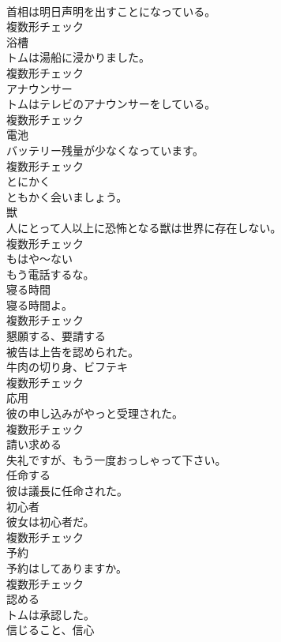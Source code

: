 \documentclass[8pt]{extreport}
\begin{document}
\begin{CJK}{UTF8}{min}
\\	首相は明日声明を出すことになっている。	
\\	複数形チェック
\\	[名詞]	浴槽	
\\	トムは湯船に浸かりました。	
\\	複数形チェック
\\	[名詞]	アナウンサー	
\\	トムはテレビのアナウンサーをしている。	
\\	複数形チェック
\\	[名詞]	電池	
\\	バッテリー残量が少なくなっています。	
\\	複数形チェック
\\	[副詞]	とにかく	
\\	ともかく会いましょう。	
\\	[名詞]	獣	
\\	人にとって人以上に恐怖となる獣は世界に存在しない。	
\\	複数形チェック
\\	[副詞]	もはや〜ない	
\\	もう電話するな。	
\\	[名詞]	寝る時間	
\\	寝る時間よ。	
\\	複数形チェック
\\	[動詞]	懇願する、要請する	
\\	被告は上告を認められた。	
\\	[名詞]	牛肉の切り身、ビフテキ	
\\	複数形チェック
\\	[名詞]	応用	
\\	彼の申し込みがやっと受理された。	
\\	複数形チェック
\\	[動詞]	請い求める	
\\	失礼ですが、もう一度おっしゃって下さい。	
\\	[動詞]	任命する	
\\	彼は議長に任命された。	
\\	[名詞]	初心者	
\\	彼女は初心者だ。	
\\	複数形チェック
\\	[名詞]	予約	
\\	予約はしてありますか。	
\\	複数形チェック
\\	[動詞]	認める	
\\	トムは承認した。	
\\	[名詞]	信じること、信心	

\end{CJK}
\end{document}
